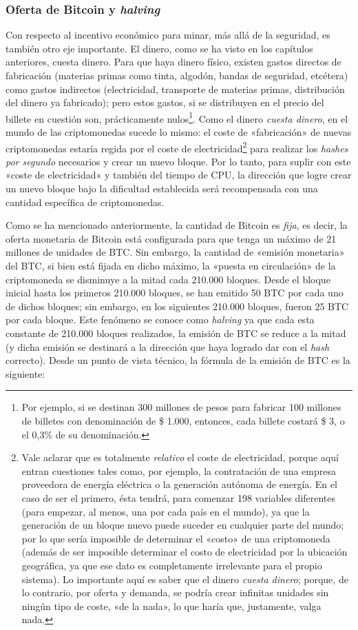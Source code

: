 \documentclass[12pt,a4paper,twoside]{book}
\begin{document}
\subsubsection{Oferta de Bitcoin y \textit{halving}}
Con respecto al incentivo económico para minar, más allá de la seguridad, es también otro eje importante. El dinero, como se ha visto en los capítulos anteriores, cuesta dinero. Para que haya dinero físico, existen gastos directos de fabricación (materias primas como tinta, algodón, bandas de seguridad, etcétera) como gastos indirectos (electricidad, transporte de materias primas, distribución del dinero ya fabricado); pero estos gastos, si se distribuyen en el precio del billete en cuestión son, prácticamente nulos\footnote{Por ejemplo, si se destinan 300 millones de pesos para fabricar 100 millones de billetes con denominación de \$ 1.000, entonces, cada billete costará \$ 3, o el 0,3\% de su denominación.}. Como el dinero \textit{cuesta dinero}, en el mundo de las criptomonedas sucede lo mismo: el coste de «fabricación» de nuevas criptomonedas estaría regida por el coste de electricidad\footnote{Vale aclarar que es totalmente \textit{relativo} el coste de electricidad, porque aquí entran cuestiones tales como, por ejemplo, la contratación de una empresa proveedora de energía eléctrica o la generación autónoma de energía. En el caso de ser el primero, ésta tendrá, para comenzar 198 variables diferentes (para empezar, al menos, una por cada país en el mundo), ya que la generación de un bloque nuevo puede suceder en cualquier parte del mundo; por lo que sería imposible de determinar el «costo» de una criptomoneda (además de ser imposible determinar el costo de electricidad por la ubicación geográfica, ya que ese dato es completamente irrelevante para el propio sistema). Lo importante aquí es saber que el dinero \textit{cuesta dinero}; porque, de lo contrario, por oferta y demanda, se podría crear infinitas unidades sin ningún tipo de coste, «de la nada», lo que haría que, justamente, valga nada.} para realizar los \textit{hashes por segundo} necesarios y crear un nuevo bloque. Por lo tanto, para suplir con este «coste de electricidad» y también del tiempo de CPU, la dirección que logre crear un nuevo bloque bajo la dificultad establecida será recompensada con una cantidad específica de criptomonedas.

Como se ha mencionado anteriormente, la cantidad de Bitcoin es \textit{fija}, es decir, la oferta monetaria de Bitcoin está configurada para que tenga un máximo de 21 millones de unidades de BTC. Sin embargo, la cantidad de «emisión monetaria» del BTC, si bien está fijada en dicho máximo, la «puesta en circulación» de la criptomoneda se disminuye a la mitad cada 210.000 bloques. Desde el bloque inicial hasta los primeros 210.000 bloques, se han emitido 50 BTC por cada uno de dichos bloques; sin embargo, en los siguientes 210.000 bloques, fueron 25 BTC por cada bloque. Este fenómeno se conoce como \textit{halving} ya que cada esta constante de 210.000 bloques realizados, la emisión de BTC se reduce a la mitad (y dicha emisión se destinará a la dirección que haya logrado dar con el \textit{hash} correcto). Desde un punto de vista técnico, la fórmula de la emisión de BTC es la siguiente:
\end{document}
